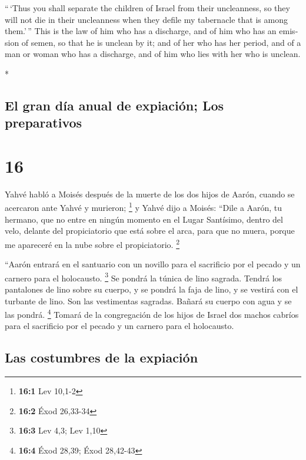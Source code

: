 \begin{paracol}{2}
\begin{otherlanguage}{english}
 ``\,`Thus you shall separate the children of Israel from
their uncleanness, so they will not die in their uncleanness when they
defile my tabernacle that is among them.'\,''  This is
the law of him who has a discharge, and of him who has an emission of
semen, so that he is unclean by it;  and of her who has
her period, and of a man or woman who has a discharge, and of him who
lies with her who is unclean.

\end{otherlanguage}

\switchcolumn[0]*

\hypertarget{el-gran-duxeda-anual-de-expiaciuxf3n-los-preparativos}{%
\subsection{El gran día anual de expiación; Los
preparativos}\label{el-gran-duxeda-anual-de-expiaciuxf3n-los-preparativos}}

\hypertarget{section-30}{%
\section{16}\label{section-30}}

 Yahvé habló a Moisés después de la muerte de los dos
hijos de Aarón, cuando se acercaron ante Yahvé y murieron; \footnote{\textbf{16:1}
  Lev 10,1-2}  y Yahvé dijo a Moisés: ``Dile a Aarón, tu
hermano, que no entre en ningún momento en el Lugar Santísimo, dentro
del velo, delante del propiciatorio que está sobre el arca, para que no
muera, porque me apareceré en la nube sobre el propiciatorio.
\footnote{\textbf{16:2} Éxod 26,33-34}

 ``Aarón entrará en el santuario con un novillo para el
sacrificio por el pecado y un carnero para el holocausto. \footnote{\textbf{16:3}
  Lev 4,3; Lev 1,10}  Se pondrá la túnica de lino sagrada.
Tendrá los pantalones de lino sobre su cuerpo, y se pondrá la faja de
lino, y se vestirá con el turbante de lino. Son las vestimentas
sagradas. Bañará su cuerpo con agua y se las pondrá. \footnote{\textbf{16:4}
  Éxod 28,39; Éxod 28,42-43}  Tomará de la congregación de
los hijos de Israel dos machos cabríos para el sacrificio por el pecado
y un carnero para el holocausto.

\hypertarget{las-costumbres-de-la-expiaciuxf3n}{%
\subsection{Las costumbres de la
expiación}\label{las-costumbres-de-la-expiaciuxf3n}}


\end{paracol}
